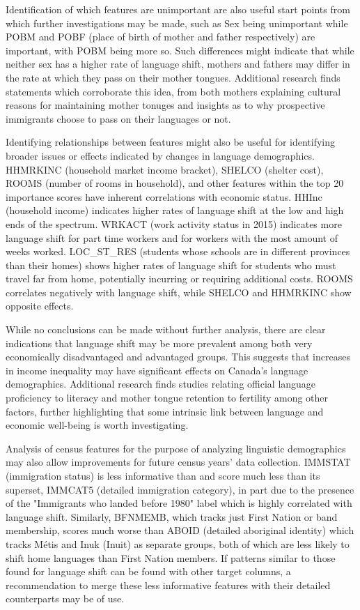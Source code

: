 \documentclass[10pt, conference, compsocconf]{IEEEtran}
\begin{document}
Identification of which features are unimportant are also useful start points from which further investigations may be made, such as Sex being unimportant while POBM and POBF (place of birth of mother and father respectively) are important, with POBM being more so.  Such differences might indicate that while neither sex has a higher rate of language shift, mothers and fathers may differ in the rate at which they pass on their mother tongues.  Additional research finds statements which corroborate this idea, from both mothers explaining cultural reasons for maintaining mother tonuges and insights as to why prospective immigrants choose to pass on their languages or not. \cite{mother1} \cite{policy1}

Identifying relationships between features might also be useful for identifying broader issues or effects indicated by changes in language demographics.  HHMRKINC (household market income bracket), SHELCO (shelter cost), ROOMS (number of rooms in household), and other features within the top 20 importance scores have inherent correlations with economic status.  HHInc (household income) indicates higher rates of language shift at the low and high ends of the spectrum.  WRKACT (work activity status in 2015) indicates more language shift for part time workers and for workers with the most amount of weeks worked.   LOC\_ST\_RES (students whose schools are in different provinces than their homes) shows higher rates of language shift for students who must travel far from home, potentially incurring or requiring additional costs.  ROOMS correlates negatively with language shift, while SHELCO and HHMRKINC show opposite effects.

While no conclusions can be made without further analysis, there are clear indications that language shift may be more prevalent among both very economically disadvantaged and advantaged groups.  This suggests that increases in income inequality may have significant effects on Canada's language demographics.  Additional research finds studies relating official language proficiency to literacy and mother tongue retention to fertility among other factors, further highlighting that some intrinsic link between language and economic well-being is worth investigating. \cite{literacy1} \cite{fertility1}

Analysis of census features for the purpose of analyzing linguistic demographics may also allow improvements for future census years' data collection.  IMMSTAT (immigration status) is less informative than and score much less than its superset, IMMCAT5 (detailed immigration category), in part due to the presence of the "Immigrants who landed before 1980" label which is highly correlated with language shift.  Similarly, BFNMEMB, which tracks just First Nation or band membership, scores much worse than ABOID (detailed aboriginal identity) which tracks Métis and Inuk (Inuit) as separate groups, both of which are less likely to shift home languages than First Nation members.  If patterns similar to those found for language shift can be found with other target columns, a recommendation to merge these less informative features with their detailed counterparts may be of use.
\end{document}
